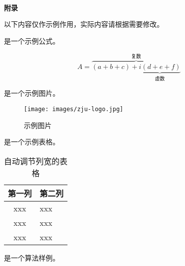 \clearpage
{}
\begin{center}
    ~\\[-1.5em]
    \textbf{附\quad 录}
\end{center}


\setcounter{section}{1}
\renewcommand{\thesection}{A\arabic{section}}

\par 以下内容仅作示例作用，实际内容请根据需要修改。

\par {} 是一个示例公式。

\begin{equation}
  \label{equ:sample}
  A=\overbrace{(a+b+c)+\underbrace{i(d+e+f)}_{\text{虚数}}}^{\text{复数}}
\end{equation}

\par {} 是一个示例图片。

\begin{figure}[htbp]
  \centering
  \texttt{[image: images/zju-logo.jpg]}
  \caption{\label{fig:sample}示例图片}
\end{figure}

\par {} 是一个示例表格。

\begin{table}[htbp]
  \caption{\label{tab:sample}自动调节列宽的表格}
  \begin{tabularx}{\linewidth}{c|X<{\centering}}
      \hline
      第一列 & 第二列 \\ \hline
      xxx & xxx \\ \hline
      xxx & xxx \\ \hline
      xxx & xxx \\ \hline
  \end{tabularx}
\end{table}

\par {} 是一个算法样例。

